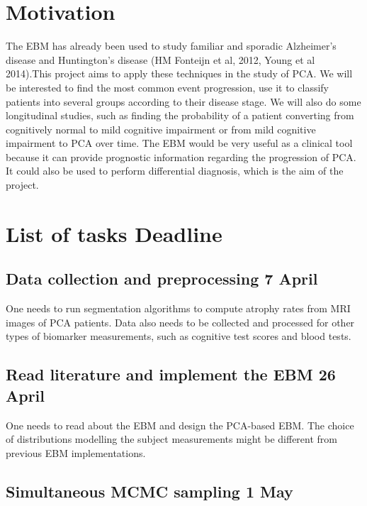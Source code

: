 \documentclass[12pt,a4paper,oneside]{report}
\begin{document}
\section*{Motivation}

The EBM has already been used to study familiar and sporadic Alzheimer's disease and Huntington's disease (HM Fonteijn et al, 2012, Young et al 2014).This project aims to apply these techniques in the study of PCA. We will be interested to find the most common event progression, use it to classify patients into several groups according to their disease stage. We will also do some longitudinal studies, such as finding the probability of a patient converting from cognitively normal to mild cognitive impairment or from mild cognitive impairment to PCA over time. The EBM would be very useful as a clinical tool because it can provide prognostic information regarding the progression of PCA. It could also be used to perform differential diagnosis, which is the aim of the project.


\section*{List of tasks \hfill Deadline}

\renewcommand\arraystretch{4.4} %
\newcommand\taskHeader[1]{\Large{\textbf{#1}}}

\subsection*{\noindent Data collection and preprocessing \hfill 7 April}

One needs to run segmentation algorithms to compute atrophy rates from MRI images of PCA patients. Data also needs to be collected and processed for other types of biomarker measurements, such as cognitive test scores and blood tests.

\subsection*{\noindent Read literature and implement the EBM \hfill 26 April}

One needs to read about the EBM and design the PCA-based EBM. The choice of distributions modelling the subject measurements might be different from previous EBM implementations.

\subsection*{\noindent Simultaneous MCMC sampling \hfill 1 May}
\end{document}
